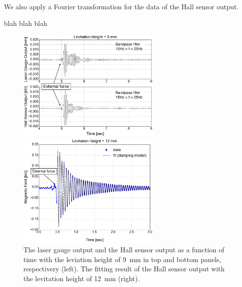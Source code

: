 \documentclass[a4paper]{jpconf}
\begin{document}
We also apply a Fourier transformation for the data of the Hall sensor output.


blah blah blah


\begin{figure}[htbp]
  \centering
  \begin{minipage}{0.45\hsize}
  \includegraphics[width=70mm]{vibration_up.eps}
  \end{minipage}
  \begin{minipage}{0.45\hsize}
    \centering
    \includegraphics[width=70mm]{vibration_fit.eps}
  \end{minipage}
  \caption{The laser gauge output and the Hall sensor output as a function of time with the leviation height of 9~mm in top and bottom panels, respectivery (left).
    The fitting result of the Hall sensor output with the levitation height of 12~mm (right).}
  \label{vibration}
\end{figure}
\end{document}
